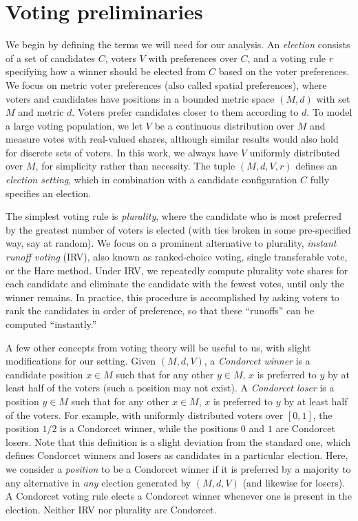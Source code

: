 \documentclass{article}
\theoremstyle{theorem}
\theoremstyle{definition}
\begin{document}
\section{Voting preliminaries}
We begin by defining the terms we will need for our analysis. An \emph{election} consists of a set of candidates $C$, voters $V$ with preferences over $C$, and a voting rule $r$ specifying how a winner should be elected from $C$ based on the voter preferences. We focus on metric voter preferences (also called spatial preferences), where voters and candidates have positions in a bounded metric space $(M,d)$ with set $M$ and metric $d$. Voters prefer candidates closer to them according to $d$. To model a large voting population, we let $V$ be a continuous distribution over $M$ and measure votes with real-valued shares, although similar results would also hold for discrete sets of voters. In this work, we always have $V$ uniformly distributed over $M$, for simplicity rather than necessity. The tuple $(M, d, V, r)$ defines an \emph{election setting}, which in combination with a candidate configuration $C$ fully specifies an election. 

The simplest voting rule is \emph{plurality}, where the candidate who is most preferred by the greatest number of voters is elected (with ties broken in some pre-specified way, say at random). We focus on a prominent alternative to plurality, \emph{instant runoff voting} (IRV), also known as ranked-choice voting, single transferable vote, or the Hare method. Under IRV, we repeatedly compute plurality vote shares for each candidate and eliminate the candidate with the fewest votes, until only the winner remains. In practice, this procedure is accomplished by asking voters to rank the candidates in order of preference, so that these ``runoffs'' can be computed ``instantly.''

A few other concepts from voting theory will be useful to us, with slight modifications for our setting. Given $(M, d, V)$, a \emph{Condorcet winner} is a candidate position $x\in M$ such that for any other $y \in M$, $x$ is preferred to $y$ by at least half of the voters (such a position may not exist). A \emph{Condorcet loser} is a position  $y\in M$ such that for any other $x \in M$, $x$ is preferred to  $y$ by at least half of the voters.  For example, with uniformly distributed voters over $[0, 1]$, the position $1/2$ is a Condorcet winner, while the positions $0$ and $1$ are Condorcet losers. Note that this definition is a slight deviation from the standard one, which defines Condorcet winners and losers as candidates in a particular election. Here, we consider a \emph{position} to be a Condorcet winner if it is preferred by a majority to any alternative in \emph{any} election generated by $(M, d, V)$ (and likewise for losers). A Condorcet voting rule elects a Condorcet winner whenever one is present in the election. Neither IRV nor plurality are Condorcet. 
\end{document}
